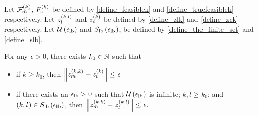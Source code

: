 \begin{theorem}
\label{bounded_projection_theorem}
Let ${\mathcal F_m^{(k)}}$, ${F_c^{(k)}}$ be defined by \cref{define_feasiblek} and \cref{define_truefeasiblek} respectively.
Let ${z_l^{(k, l)}}$ and ${z_c^{(k)}}$ be defined by \cref{define_zlk} and \cref{define_zck} respectively.
Let ${\mathcal U\left(\epsilon_{\textrm{lb}}\right)}$ and ${S_{\textrm{lb}}\left(\epsilon_{\textrm{lb}}\right)}$, be defined by \cref{define_the_finite_set} and \cref{define_slb}.




For any $\epsilon > 0$, there exists $k_0 \in \mathbb N$ such that
\begin{itemize}
\item if $k \ge k_0$, then
$
\left\|{z_m^{(k, k)}} - {z_c^{(k)}}\right\| \le \epsilon
$
\item if there exists an ${\epsilon_{\textrm{lb}}} > 0$ such that ${\mathcal U\left(\epsilon_{\textrm{lb}}\right)}$ is infinite; $k, l \ge k_0$; and $(k, l) \in {S_{\textrm{lb}}\left(\epsilon_{\textrm{lb}}\right)}$, then 
$
\left\|{z_m^{(k, k)}} - {z_l^{(k, l)}}\right\| \le \epsilon.
$
\end{itemize}
\end{theorem}
